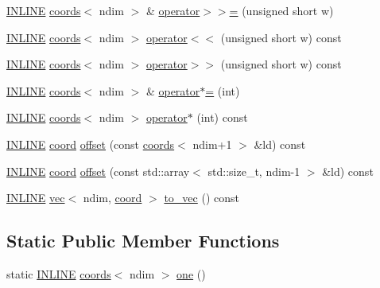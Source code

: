 \begin{DoxyCompactItemize}
\hyperlink{common_8hpp_a2eb6f9e0395b47b8d5e3eeae4fe0c116}{I\+N\+L\+I\+NE} \hyperlink{structshark_1_1ndim_1_1coords}{coords}$<$ ndim $>$ \& \hyperlink{structshark_1_1ndim_1_1coords_a6e6f6d900230a674e60e7250d8dd259f}{operator$>$$>$=} (unsigned short w)
\item 
\hyperlink{common_8hpp_a2eb6f9e0395b47b8d5e3eeae4fe0c116}{I\+N\+L\+I\+NE} \hyperlink{structshark_1_1ndim_1_1coords}{coords}$<$ ndim $>$ \hyperlink{structshark_1_1ndim_1_1coords_a71ac780cdfa0eb56845de085db1245d8}{operator$<$$<$} (unsigned short w) const
\item 
\hyperlink{common_8hpp_a2eb6f9e0395b47b8d5e3eeae4fe0c116}{I\+N\+L\+I\+NE} \hyperlink{structshark_1_1ndim_1_1coords}{coords}$<$ ndim $>$ \hyperlink{structshark_1_1ndim_1_1coords_a21e2bd4dc4a2a3c3e6601e485e6959c0}{operator$>$$>$} (unsigned short w) const
\item 
\hyperlink{common_8hpp_a2eb6f9e0395b47b8d5e3eeae4fe0c116}{I\+N\+L\+I\+NE} \hyperlink{structshark_1_1ndim_1_1coords}{coords}$<$ ndim $>$ \& \hyperlink{structshark_1_1ndim_1_1coords_a21edb6ede1b21a35135d016269a8a96f}{operator$\ast$=} (int)
\item 
\hyperlink{common_8hpp_a2eb6f9e0395b47b8d5e3eeae4fe0c116}{I\+N\+L\+I\+NE} \hyperlink{structshark_1_1ndim_1_1coords}{coords}$<$ ndim $>$ \hyperlink{structshark_1_1ndim_1_1coords_a7ce7913d4233a7ec7697b69ac1023e10}{operator$\ast$} (int) const
\item 
\hyperlink{common_8hpp_a2eb6f9e0395b47b8d5e3eeae4fe0c116}{I\+N\+L\+I\+NE} \hyperlink{namespaceshark_a767a92d5dd82cb82266473bff42fa6d9}{coord} \hyperlink{structshark_1_1ndim_1_1coords_a0c905dc9ae7a2ea1c3a8cd4aaf542d73}{offset} (const \hyperlink{structshark_1_1ndim_1_1coords}{coords}$<$ ndim+1 $>$ \&ld) const
\item 
\hyperlink{common_8hpp_a2eb6f9e0395b47b8d5e3eeae4fe0c116}{I\+N\+L\+I\+NE} \hyperlink{namespaceshark_a767a92d5dd82cb82266473bff42fa6d9}{coord} \hyperlink{structshark_1_1ndim_1_1coords_a9db29c2f1cddc01f6deb07fe5dc72476}{offset} (const std\+::array$<$ std\+::size\+\_\+t, ndim-\/1 $>$ \&ld) const
\item 
\hyperlink{common_8hpp_a2eb6f9e0395b47b8d5e3eeae4fe0c116}{I\+N\+L\+I\+NE} \hyperlink{structshark_1_1ndim_1_1vec}{vec}$<$ ndim, \hyperlink{namespaceshark_a767a92d5dd82cb82266473bff42fa6d9}{coord} $>$ \hyperlink{structshark_1_1ndim_1_1coords_a5fb26fdaeb752fd27576e4948f1d0a98}{to\+\_\+vec} () const
\end{DoxyCompactItemize}
\subsection*{Static Public Member Functions}
\begin{DoxyCompactItemize}
\item 
static \hyperlink{common_8hpp_a2eb6f9e0395b47b8d5e3eeae4fe0c116}{I\+N\+L\+I\+NE} \hyperlink{structshark_1_1ndim_1_1coords}{coords}$<$ ndim $>$ \hyperlink{structshark_1_1ndim_1_1coords_ad2d1e81259a5886bf6e15cd41c018fcc}{one} ()
\end{DoxyCompactItemize}

